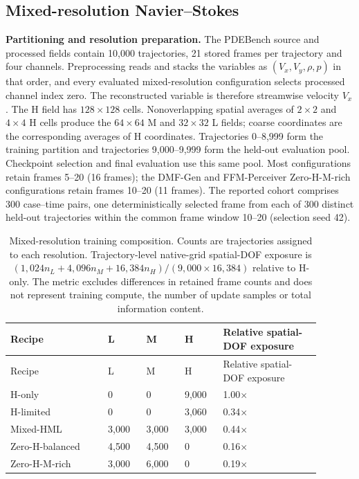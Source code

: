 \documentclass[11pt]{article}
\newcommand{\sisubsection}[1]{%
\FloatBarrier
\Needspace{5\baselineskip}%
\subsection{#1}%
}
\newcommand{\detail}[1]{\par\Needspace{4\baselineskip}\textbf{#1}\enspace}
\begin{document}
\sisubsection{Mixed-resolution Navier--Stokes}
\label{subsec:data-mixed}
\detail{Partitioning and resolution preparation.} The PDEBench source and processed fields contain 10,000 trajectories, 21 stored frames per trajectory and four channels. Preprocessing reads and stacks the variables as $(V_x,V_y,\rho,p)$ in that order, and every evaluated mixed-resolution configuration selects processed channel index zero. The reconstructed variable is therefore streamwise velocity $V_x$. The H field has $128\times128$ cells. Nonoverlapping spatial averages of $2\times2$ and $4\times4$ H cells produce the $64\times64$ M and $32\times32$ L fields; coarse coordinates are the corresponding averages of H coordinates. Trajectories 0--8,999 form the training partition and trajectories 9,000--9,999 form the held-out evaluation pool. Checkpoint selection and final evaluation use this same pool. Most configurations retain frames 5--20 (16 frames); the DMF-Gen and FFM-Perceiver Zero-H-M-rich configurations retain frames 10--20 (11 frames). The reported cohort comprises 300 case--time pairs, one deterministically selected frame from each of 300 distinct held-out trajectories within the common frame window 10--20 (selection seed 42).

{\small
\begin{longtable}{@{}P{0.28\linewidth} C{0.11\linewidth} C{0.11\linewidth} C{0.11\linewidth} P{0.28\linewidth}@{}}
\caption{Mixed-resolution training composition. Counts are trajectories assigned to each resolution. Trajectory-level native-grid spatial-DOF exposure is $(1{,}024n_L+4{,}096n_M+16{,}384n_H)/(9{,}000\times16{,}384)$ relative to H-only. The metric excludes differences in retained frame counts and does not represent training compute, the number of update samples or total information content.}\label{tab:recipes}\\
\toprule Recipe & L & M & H & Relative spatial-DOF exposure \\
\midrule\endfirsthead
\toprule Recipe & L & M & H & Relative spatial-DOF exposure \\
\midrule\endhead
\bottomrule\endlastfoot
H-only & 0 & 0 & 9,000 & 1.00$\times$ \\
H-limited & 0 & 0 & 3,060 & 0.34$\times$ \\
Mixed-HML & 3,000 & 3,000 & 3,000 & 0.44$\times$ \\
Zero-H-balanced & 4,500 & 4,500 & 0 & 0.16$\times$ \\
Zero-H-M-rich & 3,000 & 6,000 & 0 & 0.19$\times$ \\
\end{longtable}
}
\end{document}
